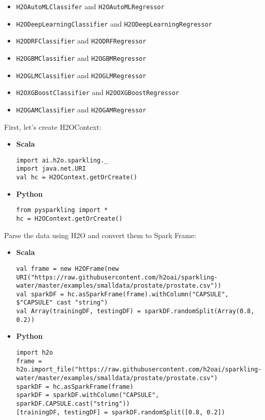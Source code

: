 \documentclass{standalone}
\begin{document}
	\begin{itemize}
		\item \texttt{H2OAutoMLClassifer} and \texttt{H2OAutoMLRegressor}
		\item \texttt{H2ODeepLearningClassifier} and \texttt{H2ODeepLearningRegressor}
		\item \texttt{H2ODRFClassifier} and \texttt{H2ODRFRegressor}
		\item \texttt{H2OGBMClassifier} and \texttt{H2OGBMRegressor}
		\item \texttt{H2OGLMClassifier} and \texttt{H2OGLMRegressor}
		\item \texttt{H2OXGBoostClassifier} and \texttt{H2OOXGBoostRegressor}
		\item \texttt{H2OGAMClassifier} and \texttt{H2OGAMRegressor}
	\end{itemize}

	First, let's create H2OContext:

	\begin{itemize}
		\item \textbf{Scala} \begin{lstlisting}[style=Scala]
import ai.h2o.sparkling._
import java.net.URI
val hc = H2OContext.getOrCreate()
		\end{lstlisting}
		\item \textbf{Python} \begin{lstlisting}[style=Python]
from pysparkling import *
hc = H2OContext.getOrCreate()
		\end{lstlisting}
	\end{itemize}

	Parse the data using H2O and convert them to Spark Frame:

	\begin{itemize}
		\item \textbf{Scala} \begin{lstlisting}[style=Scala]
val frame = new H2OFrame(new URI("https://raw.githubusercontent.com/h2oai/sparkling-water/master/examples/smalldata/prostate/prostate.csv"))
val sparkDF = hc.asSparkFrame(frame).withColumn("CAPSULE", $"CAPSULE" cast "string")
val Array(trainingDF, testingDF) = sparkDF.randomSplit(Array(0.8, 0.2))
		\end{lstlisting}
		\item \textbf{Python} \begin{lstlisting}[style=Python]
import h2o
frame = h2o.import_file("https://raw.githubusercontent.com/h2oai/sparkling-water/master/examples/smalldata/prostate/prostate.csv")
sparkDF = hc.asSparkFrame(frame)
sparkDF = sparkDF.withColumn("CAPSULE", sparkDF.CAPSULE.cast("string"))
[trainingDF, testingDF] = sparkDF.randomSplit([0.8, 0.2])
		\end{lstlisting}
	\end{itemize}
\end{document}
